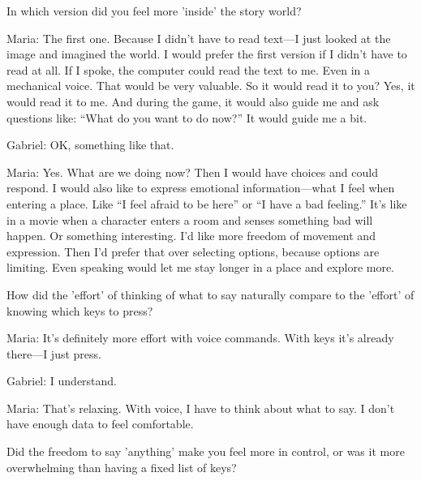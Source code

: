 \begin{QandA}
   \item In which version did you feel more 'inside' the story world?
         \begin{answered}
            Maria: The first one.
            Because I didn’t have to read text—I just looked at the image and imagined the world.
            I would prefer the first version if I didn’t have to read at all.
            If I spoke, the computer could read the text to me.
            Even in a mechanical voice.
            That would be very valuable.
            So it would read it to you?
            Yes, it would read it to me.
            And during the game, it would also guide me and ask questions like:
            “What do you want to do now?”
            It would guide me a bit.

            Gabriel: OK, something like that.

            Maria: Yes.
            What are we doing now?
            Then I would have choices and could respond.
            I would also like to express emotional information—what I feel when entering a place.
            Like “I feel afraid to be here” or “I have a bad feeling.”
            It’s like in a movie when a character enters a room and senses something bad will happen.
            Or something interesting.
            I’d like more freedom of movement and expression.
            Then I’d prefer that over selecting options, because options are limiting.
            Even speaking would let me stay longer in a place and explore more.

         \end{answered}

   \item How did the 'effort' of thinking of what to say naturally compare to the 'effort' of knowing which keys to press?

         \begin{answered}
         Maria: It’s definitely more effort with voice commands.
         With keys it’s already there—I just press.

         Gabriel: I understand.

         Maria: That’s relaxing.
         With voice, I have to think about what to say.
         I don’t have enough data to feel comfortable.

         \end{answered}

    \item Did the freedom to say 'anything' make you feel more in control, or was it more overwhelming than having a fixed list of keys?


\end{QandA}
